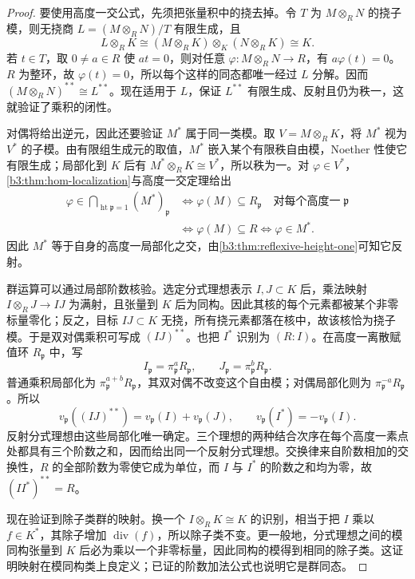 \begin{proof}
	要使用高度一交公式，先须把张量积中的挠去掉。令 \(T\) 为 \(M\otimes_RN\) 的挠子模，则无挠商 \(L=(M\otimes_RN)/T\) 有限生成，且
	\[
		L\otimes_RK\cong (M\otimes_RK)\otimes_K(N\otimes_RK)\cong K.
	\]
	若 \(t\in T\)，取 \(0\ne a\in R\) 使 \(at=0\)，则对任意 \(\varphi:M\otimes_RN\to R\)，有 \(a\varphi(t)=0\)。\(R\) 为整环，故 \(\varphi(t)=0\)，所以每个这样的同态都唯一经过 \(L\) 分解。因而 \((M\otimes_RN)^{**}\cong L^{**}\)。现在适用于 \(L\)，保证 \(L^{**}\) 有限生成、反射且仍为秩一，这就验证了乘积的闭性。

	对偶将给出逆元，因此还要验证 \(M^*\) 属于同一类模。取 \(V=M\otimes_RK\)，将 \(M^*\) 视为 \(V^*\) 的子模。由有限组生成元的取值，\(M^*\) 嵌入某个有限秩自由模，Noether 性使它有限生成；局部化到 \(K\) 后有 \(M^*\otimes_RK\cong V^*\)，所以秩为一。对 \(\varphi\in V^*\)，\cref{b3:thm:hom-localization}与高度一交定理给出
	\[
		\begin{aligned}
			\varphi\in\bigcap_{\operatorname{ht}\mathfrak p=1}(M^*)_{\mathfrak p} &\Longleftrightarrow \varphi(M)\subseteq R_{\mathfrak p} \quad\text{对每个高度一}\;\mathfrak p\\
			&\Longleftrightarrow \varphi(M)\subseteq R \Longleftrightarrow \varphi\in M^*.
		\end{aligned}
	\]
	因此 \(M^*\) 等于自身的高度一局部化之交，由\cref{b3:thm:reflexive-height-one}可知它反射。

	群运算可以通过局部阶数核验。选定分式理想表示 \(I,J\subset K\) 后，乘法映射 \(I\otimes_RJ\rightarrow IJ\) 为满射，且张量到 \(K\) 后为同构。因此其核的每个元素都被某个非零标量零化；反之，目标 \(IJ\subset K\) 无挠，所有挠元素都落在核中，故该核恰为挠子模。于是双对偶乘积可写成 \((IJ)^{**}\)。也把 \(I^*\) 识别为 \((R:I)\)。在高度一离散赋值环 \(R_{\mathfrak p}\) 中，写
	\[
		I_{\mathfrak p}=\pi_{\mathfrak p}^{a}R_{\mathfrak p}, \qquad J_{\mathfrak p}=\pi_{\mathfrak p}^{b}R_{\mathfrak p}.
	\]
	普通乘积局部化为 \(\pi_{\mathfrak p}^{a+b}R_{\mathfrak p}\)，其双对偶不改变这个自由模；对偶局部化则为 \(\pi_{\mathfrak p}^{-a}R_{\mathfrak p}\)。所以
	\[
		v_{\mathfrak p}((IJ)^{**}) =v_{\mathfrak p}(I)+v_{\mathfrak p}(J), \qquad v_{\mathfrak p}(I^*)=-v_{\mathfrak p}(I).
	\]
	反射分式理想由这些局部化唯一确定。三个理想的两种结合次序在每个高度一素点处都具有三个阶数之和，因而给出同一个反射分式理想。交换律来自阶数相加的交换性，\(R\) 的全部阶数为零使它成为单位，而 \(I\) 与 \(I^*\) 的阶数之和均为零，故 \((II^*)^{**}=R\)。

	现在验证到除子类群的映射。换一个 \(I\otimes_RK\cong K\) 的识别，相当于把 \(I\) 乘以 \(f\in K^*\)，其除子增加 \(\operatorname{div}(f)\)，所以除子类不变。更一般地，分式理想之间的模同构张量到 \(K\) 后必为乘以一个非零标量，因此同构的模得到相同的除子类。这证明映射在模同构类上良定义；已证的阶数加法公式也说明它是群同态。


\end{proof}

